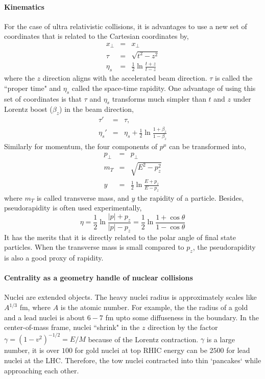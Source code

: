 \paragraph{Kinematics} For the case of ultra relativistic collisions, it is advantages to use a new set of coordinates that is related to the Cartesian coordinates by,
\begin{eqnarray}
x_\perp &=& x_\perp\\
\tau &=& \sqrt{t^2 - z^2}\\
\eta_s &=& \frac{1}{2}\ln\frac{t+z}{t-z}
\end{eqnarray}
where the $z$ direction aligns with the accelerated beam direction.
$\tau$ is called the ``proper time" and $\eta_s$ called the space-time rapidity.
One advantage of using this set of coordinates is that $\tau$ and $\eta_s$ transforms much simpler than $t$ and $z$ under Lorentz boost ($\beta_z$) in the beam direction,
\begin{eqnarray}
\tau' &=& \tau,\\
\eta_s' &=& \eta_s + \frac{1}{2}\ln\frac{1+\beta_z}{1-\beta_z}
\end{eqnarray}
Similarly for momentum, the four components of $p^\mu$ can be transformed into,
\begin{eqnarray}
p_\perp &=& p_\perp\\
m_T &=& \sqrt{E^2 - p_z^2}\\
y &=& \frac{1}{2}\ln\frac{E+p_z}{E-p_z}
\end{eqnarray}
where $m_T$ is called transverse mass, and $y$ the rapidity of a particle.
Besides, pseudorapidity is often used experimentally,
\begin{equation}
\eta = \frac{1}{2}\ln\frac{|p|+p_z}{|p|-p_z} = \frac{1}{2}\ln\frac{1+\cos\theta}{1-\cos\theta}
\end{equation}
It has the merits that it is directly related to the polar angle of final state particles.
When the transverse mass is small compared to $p_z$, the pseudorapidity is also a good proxy of rapidity.

\paragraph{Centrality as a geometry handle of nuclear collisions}
Nuclei are extended objects.
The heavy nuclei radius is approximately scales like $A^{1/3}$ fm, where  $A$ is the atomic number. 
For example, the the radius of a gold and a lead nuclei is about $6-7$ fm upto some diffuseness in the boundary.
In the center-of-mass frame,  nuclei ``shrink" in the $z$ direction by the factor $\gamma = (1-v^2)^{-1/2} = E/M$ because of the Lorentz contraction.
$\gamma$ is a large number, it is over $100$ for gold nuclei at top RHIC energy can be $2500$ for lead nuclei at the LHC.
Therefore, the tow nuclei contracted into thin `pancakes` while approaching each other.

